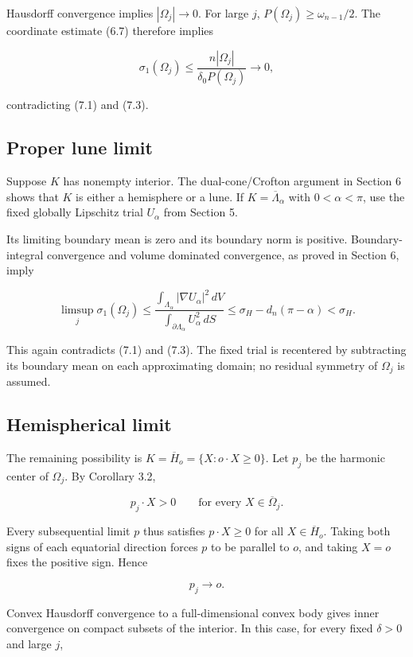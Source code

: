 \documentclass[11pt]{article}
\begin{document}
Hausdorff convergence implies \(|\Omega_j|\to0\). For large \(j\),
\(P(\Omega_j)\geq\omega_{n-1}/2\). The coordinate estimate (6.7)
therefore implies

\[
\sigma_1(\Omega_j)\leq
\frac{n|\Omega_j|}{\delta_0P(\Omega_j)}
\longrightarrow0,
\tag{7.4}
\]

contradicting (7.1) and (7.3).

\subsection{Proper lune limit}\label{proper-lune-limit}

Suppose \(K\) has nonempty interior. The dual-cone/Crofton argument in
Section 6 shows that \(K\) is either a hemisphere or a lune. If
\(K=\overline\Lambda_\alpha\) with \(0<\alpha<\pi\), use the fixed
globally Lipschitz trial \(U_\alpha\) from Section 5.

Its limiting boundary mean is zero and its boundary norm is positive.
Boundary-integral convergence and volume dominated convergence, as
proved in Section 6, imply

\[
\limsup_j\sigma_1(\Omega_j)
\leq
\frac{\int_{\Lambda_\alpha}|\nabla U_\alpha|^2\,dV}
{\int_{\partial\Lambda_\alpha}U_\alpha^2\,dS}
\leq\sigma_H-d_n(\pi-\alpha)<\sigma_H.
\tag{7.5}
\]

This again contradicts (7.1) and (7.3). The fixed trial is recentered by
subtracting its boundary mean on each approximating domain; no residual
symmetry of \(\Omega_j\) is assumed.

\subsection{Hemispherical limit}\label{hemispherical-limit}

The remaining possibility is \(K=\overline H_o=\{X:o\cdot X\geq0\}\).
Let \(p_j\) be the harmonic center of \(\Omega_j\). By Corollary 3.2,

\[
p_j\cdot X>0\qquad\text{for every }X\in\overline\Omega_j.
\tag{7.6}
\]

Every subsequential limit \(p\) thus satisfies \(p\cdot X\geq0\) for all
\(X\in\overline H_o\). Taking both signs of each equatorial direction
forces \(p\) to be parallel to \(o\), and taking \(X=o\) fixes the
positive sign. Hence

\[
p_j\longrightarrow o.
\tag{7.7}
\]

Convex Hausdorff convergence to a full-dimensional convex body gives
inner convergence on compact subsets of the interior. In this case, for
every fixed \(\delta>0\) and large \(j\),
\end{document}
